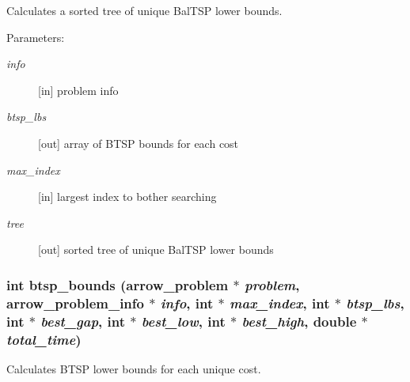 Calculates a sorted tree of unique BalTSP lower bounds. 

\begin{Desc}
\item[Parameters:]
\begin{description}
\item[{\em info}]\mbox{[}in\mbox{]} problem info \item[{\em btsp\_\-lbs}]\mbox{[}out\mbox{]} array of BTSP bounds for each cost \item[{\em max\_\-index}]\mbox{[}in\mbox{]} largest index to bother searching \item[{\em tree}]\mbox{[}out\mbox{]} sorted tree of unique BalTSP lower bounds \end{description}
\end{Desc}
\hypertarget{lib_2baltsp_2baltsp-lb_8c_793295ba41f25b193913629e408dd58e}{
\subsubsection[{btsp\_\-bounds}]{\setlength{\rightskip}{0pt plus 5cm}int btsp\_\-bounds ({\bf arrow\_\-problem} $\ast$ {\em problem}, \/  {\bf arrow\_\-problem\_\-info} $\ast$ {\em info}, \/  int $\ast$ {\em max\_\-index}, \/  int $\ast$ {\em btsp\_\-lbs}, \/  int $\ast$ {\em best\_\-gap}, \/  int $\ast$ {\em best\_\-low}, \/  int $\ast$ {\em best\_\-high}, \/  double $\ast$ {\em total\_\-time})}}
\label{lib_2baltsp_2baltsp-lb_8c_793295ba41f25b193913629e408dd58e}


Calculates BTSP lower bounds for each unique cost. 

